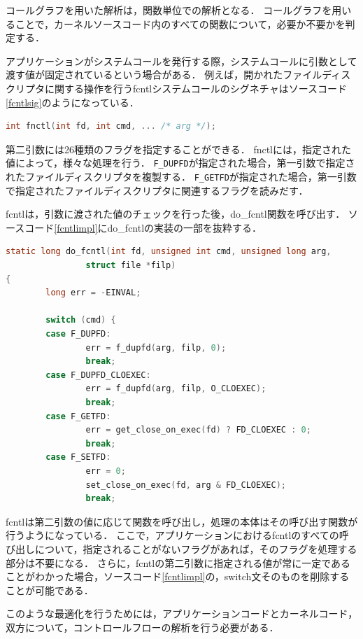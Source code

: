 \documentclass[graduation-thesis]{mlarticle}
\begin{document}
コールグラフを用いた解析は，関数単位での解析となる．
コールグラフを用いることで，カーネルソースコード内のすべての関数について，必要か不要かを判定する．

アプリケーションがシステムコールを発行する際，システムコールに引数として渡す値が固定されているという場合がある．
例えば，開かれたファイルディスクリプタに関する操作を行うfcntlシステムコールのシグネチャはソースコード\ref{fcntlsig}のようになっている．

\begin{lstlisting}[language=C, caption=fcntlシステムコールのシグネチャ, label=fcntlsig]
  int fnctl(int fd, int cmd, ... /* arg */);
\end{lstlisting}

第二引数には26種類のフラグを指定することができる．
fnctlには，指定された値によって，様々な処理を行う．
\texttt{F\_DUPFD}が指定された場合，第一引数で指定されたファイルディスクリプタを複製する．
\texttt{F\_GETFD}が指定された場合，第一引数で指定されたファイルディスクリプタに関連するフラグを読みだす．

fcntlは，引数に渡された値のチェックを行った後，do\_fcntl関数を呼び出す．
ソースコード\ref{fcntlimpl}にdo\_fcntlの実装の一部を抜粋する．

\begin{lstlisting}[language=C, caption=do\_fcntlの実装(抜粋), label=fcntlimpl]
static long do_fcntl(int fd, unsigned int cmd, unsigned long arg,
                struct file *filp)
{
        long err = -EINVAL;

        switch (cmd) {
        case F_DUPFD:
                err = f_dupfd(arg, filp, 0);
                break;
        case F_DUPFD_CLOEXEC:
                err = f_dupfd(arg, filp, O_CLOEXEC);
                break;
        case F_GETFD:
                err = get_close_on_exec(fd) ? FD_CLOEXEC : 0;
                break;
        case F_SETFD:
                err = 0;
                set_close_on_exec(fd, arg & FD_CLOEXEC);
                break;
\end{lstlisting}

fcntlは第二引数の値に応じて関数を呼び出し，処理の本体はその呼び出す関数が行うようになっている．
ここで，アプリケーションにおけるfcntlのすべての呼び出しについて，指定されることがないフラグがあれば，そのフラグを処理する部分は不要になる．
さらに，fcntlの第二引数に指定される値が常に一定であることがわかった場合，ソースコード\ref{fcntlimpl}の，switch文そのものを削除することが可能である．

このような最適化を行うためには，アプリケーションコードとカーネルコード，双方について，コントロールフローの解析を行う必要がある．
\end{document}
